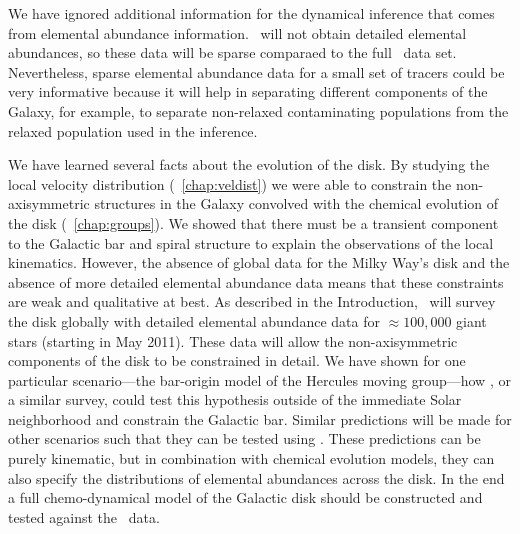 We have ignored additional information for the dynamical inference
that comes from elemental abundance information. \Gaia\ will not
obtain detailed elemental abundances, so these data will be sparse
comparaed to the full \Gaia\ data set. Nevertheless, sparse elemental
abundance data for a small set of tracers could be very informative
because it will help in separating different components of the Galaxy,
for example, to separate non-relaxed contaminating populations from
the relaxed population used in the inference. 


We have learned several facts about the evolution of the disk. By
studying the local velocity distribution
(\chaptername~\ref{chap:veldist}) we were able to constrain the
non-axisymmetric structures in the Galaxy convolved with the chemical
evolution of the disk (\chaptername~\ref{chap:groups}). We showed that
there must be a transient component to the Galactic bar and spiral
structure to explain the observations of the local
kinematics. However, the absence of global data for the Milky Way's
disk and the absence of more detailed elemental abundance data means
that these constraints are weak and qualitative at best. As described
in the Introduction, \apogee\ will survey the disk globally with
detailed elemental abundance data for $\approx 100,000$ giant stars
(starting in May 2011). These data will allow the non-axisymmetric
components of the disk to be constrained in detail. We have shown for
one particular scenario---the bar-origin model of the Hercules moving
group---how \apogee, or a similar survey, could test this hypothesis
outside of the immediate Solar neighborhood and constrain the Galactic
bar. Similar predictions will be made for other scenarios such that
they can be tested using \apogee. These predictions can be purely
kinematic, but in combination with chemical evolution models, they can
also specify the distributions of elemental abundances across the
disk. In the end a full chemo-dynamical model of the Galactic disk
should be constructed and tested against the \apogee\ data.


